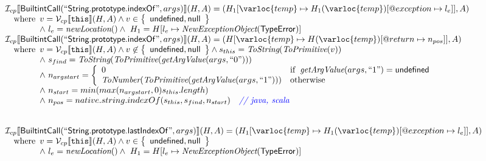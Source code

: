 \[
\begin{array}{l}
\I _{cp}\lbr \SF{BuiltintCall}(``\SF{String.prototype.indexOf}",args)\rbr(H,A)
 = (H_1[\varloc{temp}\mapsto H_1(\varloc{temp})[\varprop{exception}\mapsto l_e]], A) \\
\quad\wherec{
  v = \V _{cp}\lbr \TT{this}\rbr (H,A) \land v \in \set{\SF{undefined}, \SF{null}}\\
  \land\ l_e = \hf{newLocation}() \land\ H_1=H[l_e\mapsto\hf{NewExceptionObject}(\SF{TypeError})] 
  }\\
  
\I _{cp}\lbr \SF{BuiltintCall}(``\SF{String.prototype.indexOf}",args)\rbr(H,A)
 = (H[\varloc{temp}\mapsto H(\varloc{temp})[\varprop{return}\mapsto n_{pos}]], A) \\
\quad\wherec{
  v = \V _{cp}\lbr \TT{this}\rbr (H,A) \land v \not\in \set{\SF{undefined}, \SF{null}}
  \land s_{this} = \hf{ToString}(\hf{ToPrimitive}(v))\\
  \land\ s_{find} = \hf{ToString}(\hf{ToPrimitive}(\hf{getArgValue}(args, ``0")))\\
  \land\ n_{argstart} = \left\{\begin{array}{ll}
      0 & \ifc{\hf{getArgValue}(args, ``1") = \SF{undefined}}\\
      \hf{ToNumber}(\hf{ToPrimitive}(\hf{getArgValue}(args, ``1"))) & \owc\\
    \end{array}\right.\\
  \land\ n_{start} = min(max(n_{argstart}, 0) s_{this}.length)\\
  \land\ n_{pos} = native.string.indexOf(s_{this}, s_{find}, n_{start}) \quad\comment{{\inblue // java, scala}}\\
  }\\
\\\\


\I _{cp}\lbr \SF{BuiltintCall}(``\SF{String.prototype.lastIndexOf}",args)\rbr(H,A)
 = (H_1[\varloc{temp}\mapsto H_1(\varloc{temp})[\varprop{exception}\mapsto l_e]], A) \\
\quad\wherec{
  v = \V _{cp}\lbr \TT{this}\rbr (H,A) \land v \in \set{\SF{undefined}, \SF{null}}\\
  \land\ l_e = \hf{newLocation}() \land\ H_1=H[l_e\mapsto\hf{NewExceptionObject}(\SF{TypeError})] 
  }\\
  

\end{array}\]
